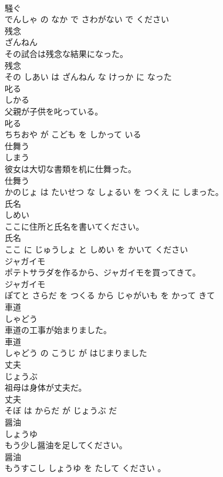 \documentclass[8pt]{extreport}
\begin{document}
\begin{CJK}{UTF8}{min}
\\	騒ぐ 
\\	でんしゃ の なか で さわがない で ください			
\\	残念	
\\	ざんねん			
\\	その試合は残念な結果になった。	
\\	残念 
\\	その しあい は ざんねん な けっか に なった			
\\	叱る	
\\	しかる			
\\	父親が子供を叱っている。	
\\	叱る 
\\	ちちおや が こども を しかって いる			
\\	仕舞う	
\\	しまう			
\\	彼女は大切な書類を机に仕舞った。	
\\	仕舞う 
\\	かのじょ は たいせつ な しょるい を つくえ に しまった。			
\\	氏名	
\\	しめい			
\\	ここに住所と氏名を書いてください。	
\\	氏名 
\\	ここ に じゅうしょ と しめい を かいて ください			
\\	ジャガイモ	
\\	ポテトサラダを作るから、ジャガイモを買ってきて。	
\\	ジャガイモ 
\\	ぽてと さらだ を つくる から じゃがいも を かって きて			
\\	車道	
\\	しゃどう			
\\	車道の工事が始まりました。	
\\	車道 
\\	しゃどう の こうじ が はじまりました			
\\	丈夫	
\\	じょうぶ			
\\	祖母は身体が丈夫だ。	
\\	丈夫 
\\	そぼ は からだ が じょうぶ だ			
\\	醤油	
\\	しょうゆ			
\\	もう少し醤油を足してください。	
\\	醤油 
\\	もうすこし しょうゆ を たして ください 。			

\end{CJK}
\end{document}
